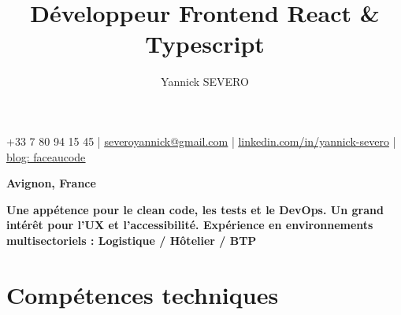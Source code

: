 \documentclass{article}
\title{Développeur Frontend React \& Typescript}
\author{Yannick SEVERO}
\date{}
\begin{document}
\maketitle
\thispagestyle{empty} %
\vspace{-4em}

\begin{center}
+33 7 80 94 15 45 | \href{mailto:severoyannick@gmail.com}{\underline{severoyannick@gmail.com}} | \href{https://linkedin.com/in/yannick-severo}{\underline{linkedin.com/in/yannick-severo}} | \href{https://www.faceaucode.com/}{\underline{blog: faceaucode}}
\end{center}
\begin{center}
\textbf{Avignon, France}
\end{center}


\begin{center}
\textbf{Une appétence pour le clean code, les tests et le DevOps. Un grand intérêt pour l'UX et l'accessibilité. Expérience en environnements multisectoriels : Logistique / Hôtelier / BTP}
\end{center}

\section*{Compétences techniques}
\end{document}
